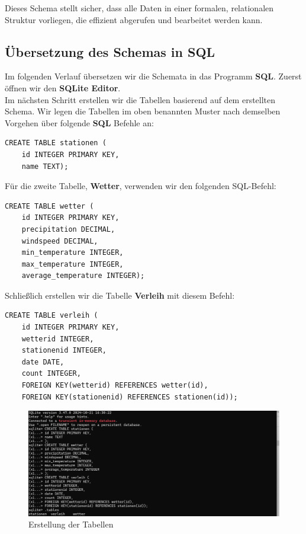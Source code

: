 \documentclass{article}
\begin{document}
Dieses Schema stellt sicher, dass alle Daten in einer formalen, relationalen Struktur vorliegen, die effizient abgerufen und bearbeitet werden kann.

\subsection{Übersetzung des Schemas in SQL}

Im folgenden Verlauf übersetzen wir die Schemata in das Programm \textbf{SQL}. Zuerst öffnen wir den \textbf{SQLite Editor}.\\Im nächsten Schritt erstellen wir die Tabellen basierend auf dem erstellten Schema. Wir legen die Tabellen im oben benannten Muster nach demselben Vorgehen über folgende \textbf{SQL} Befehle an:
\begin{verbatim}
CREATE TABLE stationen (
    id INTEGER PRIMARY KEY,
    name TEXT);
\end{verbatim}

Für die zweite Tabelle, \textbf{Wetter}, verwenden wir den folgenden SQL-Befehl:
\begin{verbatim}
CREATE TABLE wetter (
    id INTEGER PRIMARY KEY,
    precipitation DECIMAL,
    windspeed DECIMAL,
    min_temperature INTEGER,
    max_temperature INTEGER,
    average_temperature INTEGER);
\end{verbatim}
\newpage
Schließlich erstellen wir die Tabelle \textbf{Verleih} mit diesem Befehl:
\begin{verbatim}
CREATE TABLE verleih (
    id INTEGER PRIMARY KEY,
    wetterid INTEGER,
    stationenid INTEGER,
    date DATE,
    count INTEGER,
    FOREIGN KEY(wetterid) REFERENCES wetter(id),
    FOREIGN KEY(stationenid) REFERENCES stationen(id));
\end{verbatim}

\begin{figure}[ht] 
    \centering
    \includegraphics[width = \textwidth]{Screenshot 2024-11-24 183300.png}
    \caption{Erstellung der Tabellen}
    \label{fig:dax}
\end{figure}
\end{document}
